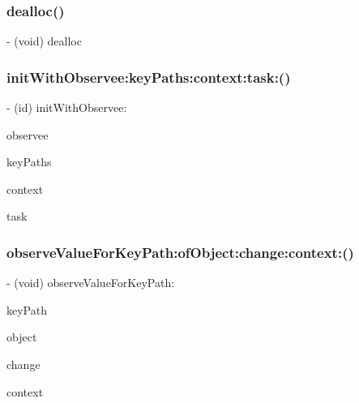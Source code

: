 \subsubsection{\texorpdfstring{dealloc()}{dealloc()}}
{\footnotesize\ttfamily -\/ (void) dealloc \begin{DoxyParamCaption}{ }\end{DoxyParamCaption}\hspace{0.3cm}{\ttfamily [implementation]}}

\mbox{\label{interface___b_k_observer_a4a3382dea1d7db53d36a804c100a6ce4}} 
\subsubsection{\texorpdfstring{init\+With\+Observee\+:key\+Paths\+:context\+:task\+:()}{initWithObservee:keyPaths:context:task:()}}
{\footnotesize\ttfamily -\/ (id) init\+With\+Observee\+: \begin{DoxyParamCaption}\item[{(id)}]{observee }\item[{keyPaths:(N\+S\+Array $\ast$)}]{key\+Paths }\item[{context:(B\+K\+Observer\+Context)}]{context }\item[{task:(id)}]{task }\end{DoxyParamCaption}}

\mbox{\label{interface___b_k_observer_a6ea2074a7275ae6c2d8b6294d2813c48}} 
\subsubsection{\texorpdfstring{observe\+Value\+For\+Key\+Path\+:of\+Object\+:change\+:context\+:()}{observeValueForKeyPath:ofObject:change:context:()}}
{\footnotesize\ttfamily -\/ (void) observe\+Value\+For\+Key\+Path\+: \begin{DoxyParamCaption}\item[{(N\+S\+String $\ast$)}]{key\+Path }\item[{ofObject:(id)}]{object }\item[{change:(N\+S\+Dictionary$<$N\+S\+Key\+Value\+Change\+Key,id$>$ $\ast$)}]{change }\item[{context:(void $\ast$)}]{context }\end{DoxyParamCaption}\hspace{0.3cm}{\ttfamily [implementation]}}


